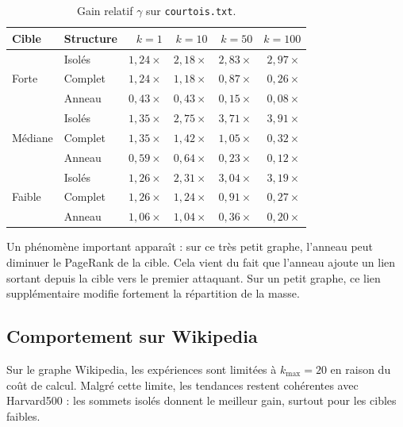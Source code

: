 \documentclass[12pt,a4paper]{article}
\theoremstyle{definition}
\begin{document}
\begin{table}[H]
\centering
\caption{Gain relatif $\gamma$ sur \texttt{courtois.txt}.}
\label{tab:courtois}
\small
\begin{tabular}{llrrrr}
\toprule
\textbf{Cible} & \textbf{Structure} & $k=1$ & $k=10$ & $k=50$ & $k=100$ \\
\midrule
\multirow{3}{*}{Forte}
 & Isolés  & $1{,}24\times$ & $2{,}18\times$ & $2{,}83\times$ & $2{,}97\times$ \\
 & Complet & $1{,}24\times$ & $1{,}18\times$ & $0{,}87\times$ & $0{,}26\times$ \\
 & Anneau  & $0{,}43\times$ & $0{,}43\times$ & $0{,}15\times$ & $0{,}08\times$ \\
\midrule
\multirow{3}{*}{Médiane}
 & Isolés  & $1{,}35\times$ & $2{,}75\times$ & $3{,}71\times$ & $3{,}91\times$ \\
 & Complet & $1{,}35\times$ & $1{,}42\times$ & $1{,}05\times$ & $0{,}32\times$ \\
 & Anneau  & $0{,}59\times$ & $0{,}64\times$ & $0{,}23\times$ & $0{,}12\times$ \\
\midrule
\multirow{3}{*}{Faible}
 & Isolés  & $1{,}26\times$ & $2{,}31\times$ & $3{,}04\times$ & $3{,}19\times$ \\
 & Complet & $1{,}26\times$ & $1{,}24\times$ & $0{,}91\times$ & $0{,}27\times$ \\
 & Anneau  & $1{,}06\times$ & $1{,}04\times$ & $0{,}36\times$ & $0{,}20\times$ \\
\bottomrule
\end{tabular}
\end{table}

Un phénomène important apparaît : sur ce très petit graphe, l'anneau peut
diminuer le PageRank de la cible. Cela vient du fait que l'anneau ajoute un lien
sortant depuis la cible vers le premier attaquant. Sur un petit graphe, ce lien
supplémentaire modifie fortement la répartition de la masse.

\subsection{Comportement sur Wikipedia}

Sur le graphe Wikipedia, les expériences sont limitées à $k_{\max}=20$ en raison
du coût de calcul. Malgré cette limite, les tendances restent cohérentes avec
Harvard500 : les sommets isolés donnent le meilleur gain, surtout pour les
cibles faibles.
\end{document}
